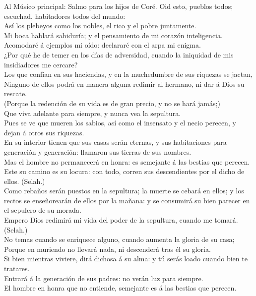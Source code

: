  Al Músico principal: Salmo para los hijos de Coré. Oid
esto, pueblos todos; escuchad, habitadores todos del mundo:\\
 Así los plebeyos como los nobles, el rico y el pobre
juntamente.\\
 Mi boca hablará sabiduría; y el pensamiento de mi corazón
inteligencia.\\
 Acomodaré á ejemplos mi oído: declararé con el arpa mi
enigma.\\
 ¿Por qué he de temer en los días de adversidad, cuando la
iniquidad de mis insidiadores me cercare?\\
 Los que confían en sus haciendas, y en la muchedumbre de
sus riquezas se jactan,\\
 Ninguno de ellos podrá en manera alguna redimir al
hermano, ni dar á Dios su rescate.\\
 (Porque la redención de su vida es de gran precio, y no
se hará jamás;)\\
 Que viva adelante para siempre, y nunca vea la
sepultura.\\
 Pues se ve que mueren los sabios, así como el insensato
y el necio perecen, y dejan á otros sus riquezas.\\
 En su interior tienen que sus casas serán eternas, y sus
habitaciones para generación y generación: llamaron sus tierras de sus
nombres.\\
 Mas el hombre no permanecerá en honra: es semejante á
las bestias que perecen.\\
 Este su camino es su locura: con todo, corren sus
descendientes por el dicho de ellos. (Selah.)\\
 Como rebaños serán puestos en la sepultura; la muerte se
cebará en ellos; y los rectos se enseñorearán de ellos por la mañana: y
se consumirá su bien parecer en el sepulcro de su morada.\\
 Empero Dios redimirá mi vida del poder de la sepultura,
cuando me tomará. (Selah.)\\
 No temas cuando se enriquece alguno, cuando aumenta la
gloria de su casa;\\
 Porque en muriendo no llevará nada, ni descenderá tras
él su gloria.\\
 Si bien mientras viviere, dirá dichosa á su alma: y tú
serás loado cuando bien te tratares.\\
 Entrará á la generación de sus padres: no verán luz para
siempre.\\
 El hombre en honra que no entiende, semejante es á las
bestias que perecen.

